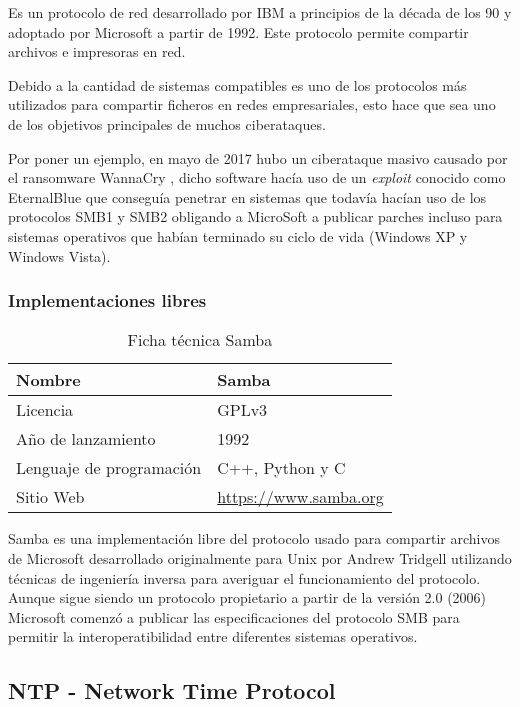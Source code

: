 Es un protocolo de red desarrollado por IBM a principios de la década de los 90 y adoptado por Microsoft a partir de 1992. Este protocolo permite compartir archivos e impresoras en red.

\bigskip
Debido a la cantidad de sistemas compatibles es uno de los protocolos más utilizados para compartir ficheros en redes empresariales, esto hace que sea uno de los objetivos principales de muchos ciberataques.

\bigskip
Por poner un ejemplo, en mayo de 2017 hubo un ciberataque masivo causado por el ransomware WannaCry \cite{sarabia_mayor_2017}, dicho software hacía uso de un \textit{exploit} conocido como EternalBlue que conseguía penetrar en sistemas que todavía hacían uso de los protocolos SMB1 y SMB2 obligando a MicroSoft a publicar parches incluso para sistemas operativos que habían terminado su ciclo de vida (Windows XP y Windows Vista).


\subsubsection {Implementaciones libres}

\begin{table}[H]
\begin{tabular}{|l|l|}
\hline
Nombre                   & Samba                        \\ \hline
Licencia                 & GPLv3                        \\ \hline
Año de lanzamiento       & 1992                         \\ \hline
Lenguaje de programación & C++, Python y C              \\ \hline
Sitio Web                & \url{https://www.samba.org} 	\\ \hline
\end{tabular}
\caption{Ficha técnica Samba}
\end{table}

Samba es una implementación libre del protocolo usado para compartir archivos de Microsoft desarrollado originalmente para Unix por Andrew Tridgell utilizando técnicas de ingeniería inversa para averiguar el funcionamiento del protocolo. Aunque sigue siendo un protocolo propietario a partir de la versión 2.0 (2006) Microsoft comenzó a publicar las especificaciones del protocolo SMB para permitir la interoperatibilidad entre diferentes sistemas operativos.


\subsection {NTP - Network Time Protocol}

